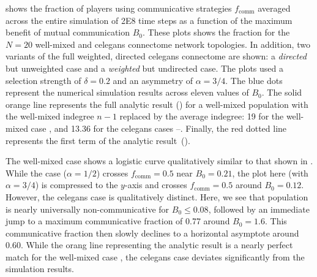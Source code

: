 \documentclass[pdflatex,lineno,referee,sn-mathphys-ay]{sn-jnl}
\begin{document}
 shows the fraction of players
using communicative strategies $f_{\text{comm}}$ averaged across
the entire simulation of \num{2E8} time steps as a function
of the maximum benefit of mutual communication $B_0$.
These plots shows the fraction for the
$N=20$ well-mixed and
\gls{celegans} connectome network topologies.
In addition, two variants of the full weighted, directed \gls{celegans}
connectome are shown:
a  \emph{directed} but unweighted case
and
a  \emph{weighted} but undirected case.
The plots used a selection strength of $\delta=0.2$
and an asymmetry of $\alpha=3/4$.
The blue dots represent the numerical simulation results across eleven
values of $B_0$.
The solid orange line represents the full analytic
result () for a well-mixed population
with the well-mixed indegree $n-1$ replaced by the average
indegree: \num{19} for the well-mixed case ,
and \num{13.36} for the \gls{celegans} cases
--.
Finally, the red dotted line represents the first term
of the analytic result~().

The well-mixed case  shows a logistic curve
qualitatively similar to that shown in \citet{tripp2022evolutionary}.
While the \citet{tripp2022evolutionary} case ($\alpha = 1/2$)
crosses $f_{\text{comm}} = 0.5$ near $B_0 = 0.21$,
the plot here (with $\alpha = 3/4$) is compressed to the $y$-axis
and crosses $f_{\text{comm}} = 0.5$ around $B_0 = 0.12$.
However, the \gls{celegans} case 
is qualitatively distinct.
Here, we see that population is nearly universally non-communicative
for $B_0 \le 0.08$,
followed by an immediate jump to a maximum communicative fraction
of \num{0.77} around $B_0 = 1.6$.
This communicative fraction then slowly declines
to a horizontal asymptote around \num{0.60}.
While the orang line representing the analytic result
is a nearly perfect match for the well-mixed case ,
the \gls{celegans} case  deviates significantly
from the simulation results.
\end{document}
